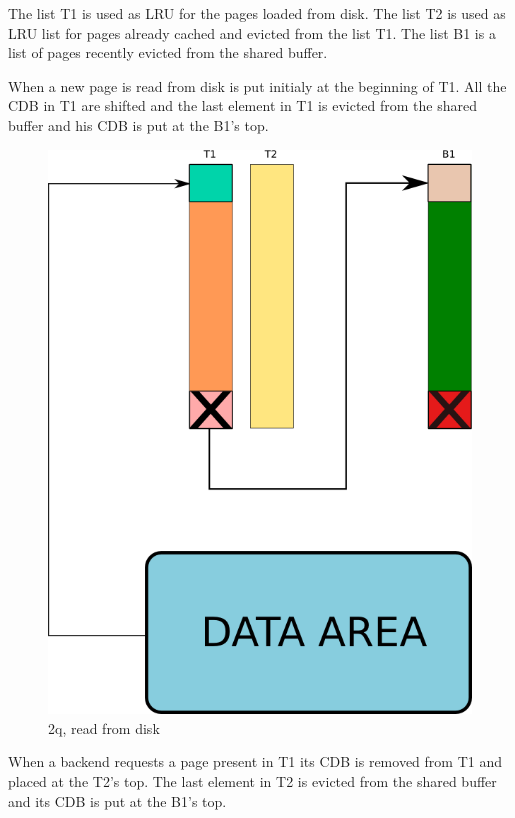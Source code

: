 The list T1 is used as LRU for the pages loaded from disk. The list T2 is used as LRU list for pages already cached 
and evicted from the list T1. The list B1 is a list of pages recently evicted from the shared buffer.

When a new page is read from disk is put initialy at the beginning of T1. All the CDB in T1 are shifted and the 
last element in T1 is evicted from the shared buffer and his CDB is put at the B1's top.\newline 

\begin{figure}[H]
\includegraphics[scale=0.4]{images/2q_01.png}

\caption{2q, read from disk}

\end{figure}

When a backend requests a page present in T1 its CDB is removed from T1 and placed at the T2's top. The last 
element in T2 is  evicted from the shared buffer and its CDB is put at the B1's top.\newline

